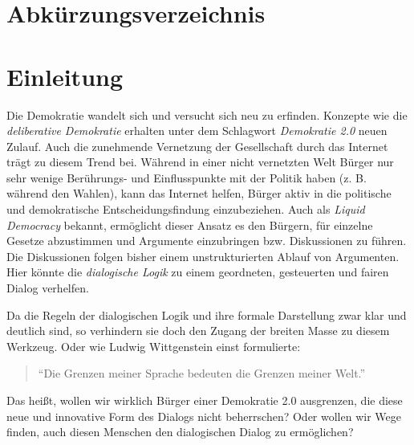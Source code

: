\documentclass[11pt,a4paper,bibtotocnumbered]{scrreprt}
\begin{document}
\begin{singlespace}

\setcounter{page}{1}

\end{singlespace}


\tableofcontents
\listoffigures
\listoftables

\chapter*{Abkürzungsverzeichnis} 

\begin{acronym}[LAENGE]
\end{acronym}

\cleardoublepage





\chapter{Einleitung} %

Die Demokratie wandelt sich und versucht sich neu zu erfinden. 
Konzepte wie die \emph{deliberative Demokratie} erhalten unter dem Schlagwort \emph{Demokratie 2.0} neuen Zulauf. 
Auch die zunehmende Vernetzung der Gesellschaft durch das Internet trägt zu diesem Trend bei. 
Während in einer nicht vernetzten Welt Bürger nur sehr wenige Berührungs- und Einflusspunkte mit der Politik haben (z. B. während den Wahlen), kann das Internet helfen, Bürger aktiv in die politische und demokratische Entscheidungsfindung einzubeziehen.
Auch als \emph{Liquid Democracy} bekannt, ermöglicht dieser Ansatz es den Bürgern, für einzelne Gesetze abzustimmen und Argumente einzubringen bzw. Diskussionen zu führen.
Die Diskussionen folgen bisher einem unstrukturierten Ablauf von Argumenten.
Hier könnte die \emph{dialogische Logik} zu einem geordneten, gesteuerten und fairen Dialog verhelfen.

Da die Regeln der dialogischen Logik und ihre formale Darstellung zwar klar und deutlich sind, so verhindern sie doch den Zugang der breiten Masse zu diesem Werkzeug.
Oder wie Ludwig Wittgenstein einst formulierte:
\begin{quote}
\enquote{Die Grenzen meiner Sprache bedeuten die Grenzen meiner Welt.}
\end{quote}
Das heißt, wollen wir wirklich Bürger einer Demokratie 2.0 ausgrenzen, die diese neue und innovative Form des Dialogs nicht beherrschen? Oder wollen wir Wege finden, auch diesen Menschen den dialogischen Dialog zu ermöglichen?
\end{document}
